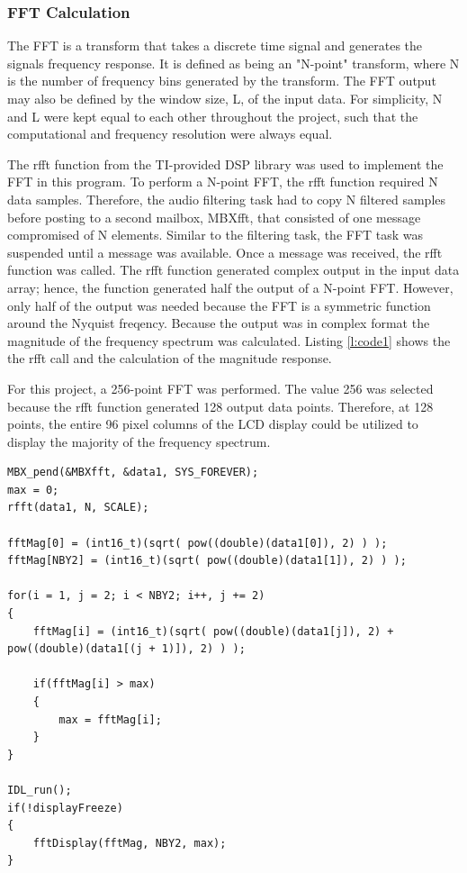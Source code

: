 \documentclass[11pt,pdftex,portrait,letterpaper]{article}
\begin{document}
\subsubsection {FFT Calculation}
The FFT is a transform that takes a discrete time signal and generates the signals frequency response. It is defined as being an "N-point" transform, where N is the number of frequency bins generated by the transform. The FFT output may also be defined by the window size, L, of the input data. For simplicity, N and L were kept equal to each other throughout the project, such that the computational and frequency resolution were always equal. 

The rfft function from the TI-provided DSP library was used to implement the FFT in this program. To perform a N-point FFT, the rfft function required N data samples. Therefore, the audio filtering task had to copy N filtered samples before posting to a second mailbox, MBXfft, that consisted of one message compromised of N elements. Similar to the filtering task, the FFT task was suspended until a message was available. Once a message was received, the rfft function was called. The rfft function generated complex output in the input data array; hence, the function generated half the output of a N-point FFT. However, only half of the output was needed because the FFT is a symmetric function around the Nyquist freqency. Because the output was in complex format the magnitude of the frequency spectrum was calculated. Listing \ref{l:code1} shows the the rfft call and the calculation of the magnitude response.

For this project, a 256-point FFT was performed. The value 256 was selected because the rfft function generated 128 output data points. Therefore, at 128 points, the entire 96 pixel columns of the LCD display could be utilized to display the majority of the frequency spectrum. 

\begin{lstlisting}[caption={FFT and magnitude calculation}, label=l:code1]
MBX_pend(&MBXfft, &data1, SYS_FOREVER);
max = 0;
rfft(data1, N, SCALE);

fftMag[0] = (int16_t)(sqrt( pow((double)(data1[0]), 2) ) );
fftMag[NBY2] = (int16_t)(sqrt( pow((double)(data1[1]), 2) ) );

for(i = 1, j = 2; i < NBY2; i++, j += 2)
{
	fftMag[i] = (int16_t)(sqrt( pow((double)(data1[j]), 2) + pow((double)(data1[(j + 1)]), 2) ) );

	if(fftMag[i] > max)
	{
		max = fftMag[i];
	}
}

IDL_run();
if(!displayFreeze)
{
	fftDisplay(fftMag, NBY2, max);
}
\end{lstlisting}
\end{document}
